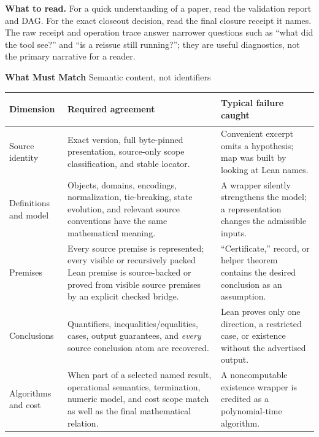 \documentclass[10pt]{article}
\begin{document}
\vspace{4pt}
\textbf{What to read.}
For a quick understanding of a paper, read the validation report and DAG. For
the exact closeout decision, read the final closure receipt it names. The raw
receipt and operation trace answer narrower questions such as ``what did the
tool see?'' and ``is a reissue still running?''; they are useful diagnostics,
not the primary narrative for a reader.

\newpage

{\sffamily\bfseries\Large What Must Match}\hfill
{\sffamily\small Semantic content, not identifiers}

\vspace{3pt}
\begin{tabularx}{\textwidth}{@{}>{\bfseries\raggedright\arraybackslash}p{}
  >{\raggedright\arraybackslash}X >{\raggedright\arraybackslash}p{}@{}}
\toprule
Dimension & Required agreement & Typical failure caught \\
\midrule
Source identity & Exact version, full byte-pinned presentation, source-only scope
classification, and stable locator. & Convenient excerpt omits a hypothesis;
map was built by looking at Lean names. \\
\addlinespace
Definitions and model & Objects, domains, encodings, normalization, tie-breaking,
state evolution, and relevant source conventions have the same mathematical
meaning. & A wrapper silently strengthens the model; a representation changes
the admissible inputs. \\
\addlinespace
Premises & Every source premise is represented; every visible or recursively
packed Lean premise is source-backed or proved from visible source premises by
an explicit checked bridge. & ``Certificate,'' record, or helper theorem
contains the desired conclusion as an assumption. \\
\addlinespace
Conclusions & Quantifiers, inequalities/equalities, cases, output guarantees,
and \emph{every} source conclusion atom are recovered. & Lean proves only one
direction, a restricted case, or existence without the advertised output. \\
\addlinespace
Algorithms and cost & When part of a selected named result, operational
semantics, termination, numeric model, and cost scope match as well as the final
mathematical relation. & A noncomputable existence wrapper is credited as a
polynomial-time algorithm. \\
\bottomrule
\end{tabularx}
\end{document}
